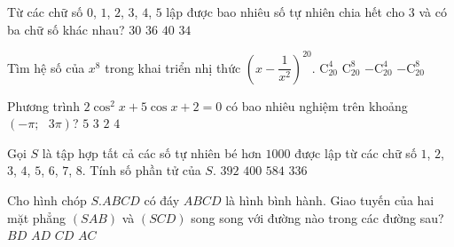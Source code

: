 \begin{ex}%
Từ các chữ số $0$, $1$, $2$, $3$, $4$, $5$ lập được bao nhiêu số tự nhiên chia hết cho $3$ và có ba chữ số khác nhau?
\choice
{$30$}
{$36$}
{\True $40$}
{$34$}
\end{ex}
\begin{ex}%
Tìm hệ số của $x^8$ trong khai triển nhị thức $\left( x-\dfrac{1}{x^2} \right)^{20}$.
\choice
{\True $\mathrm{C}_{20}^{4}$}
{$\mathrm{C}_{20}^{8}$}
{$-\mathrm{C}_{20}^{4}$}
{$-\mathrm{C}_{20}^{8}$}
\end{ex}
\begin{ex}%
Phương trình $2{{\cos}^2}x+5\cos x+2=0$ có bao nhiêu nghiệm trên khoảng $\left( -\pi ;\text{ }3\pi  \right)$?
\choice
{$5$}
{$3$}
{$2$}
{\True $4$}
\end{ex}
\begin{ex}%
Gọi $S$ là tập hợp tất cả các số tự nhiên bé hơn $1000$ được lập từ các chữ số $1$, $2$, $3$, $4$, $5$, $6$, $7$, $8$. Tính số phần tử của $S$.
\choice
{$392$}
{$400$}
{\True $584$}
{$336$}
\end{ex}
\begin{ex}%
Cho hình chóp $S.ABCD$ có đáy $ABCD$ là hình bình hành. Giao tuyến của hai mặt phẳng $(SAB)$ và $(SCD)$ song song với đường nào trong các đường sau?
\choice
{$BD$}
{$AD$}
{\True $CD$}
{$AC$}
\end{ex}
